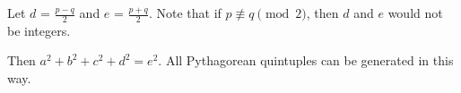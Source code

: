 \documentclass[12pt,table]{article}
\theoremstyle{definition}
\newtheorem{example}[theorem]{Example}
\theoremstyle{remark}
\newcommand{\fix}[1]{\todo[inline]{#1}}
\numberwithin{equation}{section}
\begin{document}
\begin{appendices}
\begin{itemize}
\end{itemize}




Let $d$ = $\frac{p-q}{2}$ and
$e$ = $\frac{p+q}{2}$. 
Note that if $p \not\equiv q \pmod 2$, then $d$ and $e$
would not be integers.

Then $a^2 + b^2 + c^2 + d^2 = e^2$. All Pythagorean quintuples can 
be generated in this way.


\begin{comment}

\fix{I (as of June 27 2019) believe the Heinz 57 result resulted from
an error in my computer code. I am also suspicious of the other table
in this section, and I don't see how it is directly relevant.}

\section{Testing the formulas from Theorem~\ref{theorem_as_products}}
\label{appendix_C}






The author wrote
a Python program
to test how many Pythagorean quintuples does Theorem~\ref{theorem_as_products}
represent.
This program found all primitive Pythagorean 
quintuples with all legs less than or equal to $20$.
The program then takes a form, applies it
to a set of four integers or half integers, and records the resulting 
Pythagorean quintuple.   


\begin{example}
Example of a generating list: 
\[ 4, 4, 0, 1
\] 
Example of a form:
\[
     (x+yi+zj+wk)(y+zi+wj-xk)
\]
The program applies the form: 
\[
     (4+4i+0j+1k)(4+0i+1j-4k)=20+15i+20j-8k
\]
The result:
\[
       8, 15, 20, 20
\]
The result is always a Pythagorean quintuple: 
\[8^2+ 15^2+ 20^2+ 20^2= 33^2\]
\end{example}






\end{comment}
\end{appendices}
\end{document}
